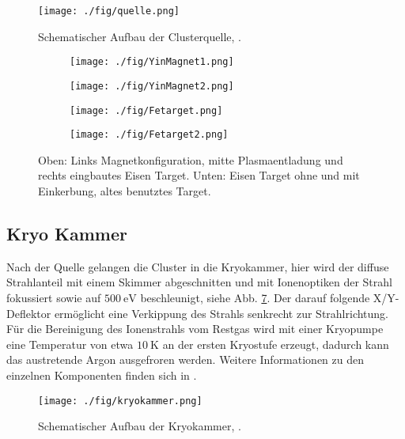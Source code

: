 \begin{figure}
    \centering
    \texttt{[image: ./fig/quelle.png]}
    \caption{Schematischer Aufbau der Clusterquelle, \cite{woltermaster}.}
    \label{fig:quelle}
\end{figure}


\begin{figure}
    \centering
    \begin{subfigure}[h]{0.34\textwidth}
        \texttt{[image: ./fig/YinMagnet1.png]}
        \caption{}
        \label{fig:magnet}
    \end{subfigure}\hfill
    \begin{subfigure}[h]{0.34\textwidth}
        \texttt{[image: ./fig/YinMagnet2.png]}
        \caption{}
        \label{fig:plasma}
    \end{subfigure}\hfill
    \begin{subfigure}[h]{0.31\textwidth}
        \texttt{[image: ./fig/Fetarget.png]}
        \caption{}
        \label{fig:target1}
    \end{subfigure}\hfill
    \begin{subfigure}[h]{1\textwidth}
        \texttt{[image: ./fig/Fetarget2.png]}
        \caption{}
        \label{fig:target2}
    \end{subfigure}
    \caption{Oben: Links Magnetkonfiguration, mitte Plasmaentladung \cite{Yin.2007} und rechts eingbautes Eisen Target. Unten: Eisen Target ohne und mit Einkerbung, altes benutztes Target.}
    \label{fig:target}
\end{figure}


\subsection{Kryo Kammer}
Nach der Quelle gelangen die Cluster in die Kryokammer, hier wird der diffuse Strahlanteil mit einem Skimmer abgeschnitten und mit Ionenoptiken der Strahl fokussiert sowie auf $\SI{500}{\eV}$ beschleunigt, siehe Abb. \ref{fig:kryokammer}.
Der darauf folgende X/Y-Deflektor ermöglicht eine Verkippung des Strahls senkrecht zur Strahlrichtung.
Für die Bereinigung des Ionenstrahls vom Restgas wird mit einer Kryopumpe eine Temperatur von etwa $\SI{10}{\kelvin}$ \cite[S. 27]{woltermaster} an der ersten Kryostufe erzeugt, dadurch kann das austretende Argon ausgefroren werden.
Weitere Informationen zu den einzelnen Komponenten finden sich in \cite{krause}.
\begin{figure}
    \centering
    \texttt{[image: ./fig/kryokammer.png]}
    \caption{Schematischer Aufbau der Kryokammer, \cite{woltermaster}.}
    \label{fig:kryokammer}
\end{figure}

